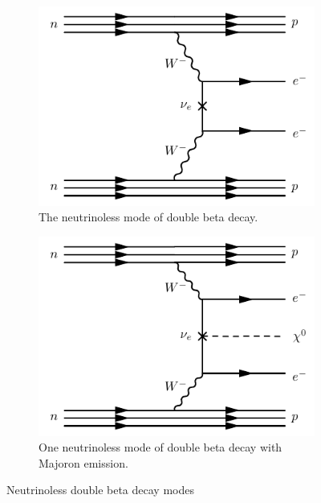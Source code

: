 \documentclass[herrin-thesis.tex]{subfiles}
\begin{document}
\begin{figure}[htb]
         \begin{subfigure}[b]{0.48\textwidth}
		\centering
		\includegraphics[width=\textwidth]{./feynman_diagrams/zeronubetabeta.pdf}
		\caption[Diagram of \(0\nu\beta\beta\)]{The neutrinoless mode of double beta decay.}
		\label{fig:nu_diagram_0nubb}
	\end{subfigure}\hfill%
         \begin{subfigure}[b]{0.48\textwidth}
		\centering
		\includegraphics[width=\textwidth]{./feynman_diagrams/zeronubetabetamajoron.pdf}
		\caption[Diagram of \(0\nu\beta\beta\chi^0\)]{One neutrinoless mode of double beta decay with Majoron emission.}
		\label{fig:nu_diagram_0nubbX}
	\end{subfigure}
	\caption[Neutrinoless double beta decay modes]{Neutrinoless double beta decay modes}
	\label{fig:nu_diagrams}
\end{figure}
\end{document}
